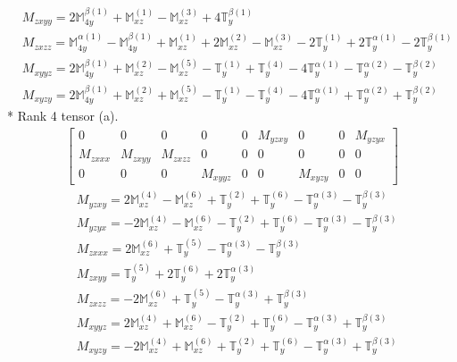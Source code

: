 \documentclass[fleqn,8pt,landscape]{jsarticle}
\begin{document}
\begin{align*}
& M_{zxyy} = 2 \mathbb{M}_{4y}^{\beta(1)} + \mathbb{M}_{xz}^{(1)} - \mathbb{M}_{xz}^{(3)} + 4 \mathbb{T}_{y}^{\beta(1)} \\
& M_{zxzz} = \mathbb{M}_{4y}^{\alpha(1)} - \mathbb{M}_{4y}^{\beta(1)} + \mathbb{M}_{xz}^{(1)} + 2 \mathbb{M}_{xz}^{(2)} - \mathbb{M}_{xz}^{(3)} - 2 \mathbb{T}_{y}^{(1)} + 2 \mathbb{T}_{y}^{\alpha(1)} - 2 \mathbb{T}_{y}^{\beta(1)} \\
& M_{xyyz} = 2 \mathbb{M}_{4y}^{\beta(1)} + \mathbb{M}_{xz}^{(2)} - \mathbb{M}_{xz}^{(5)} - \mathbb{T}_{y}^{(1)} + \mathbb{T}_{y}^{(4)} - 4 \mathbb{T}_{y}^{\alpha(1)} - \mathbb{T}_{y}^{\alpha(2)} - \mathbb{T}_{y}^{\beta(2)} \\
& M_{xyzy} = 2 \mathbb{M}_{4y}^{\beta(1)} + \mathbb{M}_{xz}^{(2)} + \mathbb{M}_{xz}^{(5)} - \mathbb{T}_{y}^{(1)} - \mathbb{T}_{y}^{(4)} - 4 \mathbb{T}_{y}^{\alpha(1)} + \mathbb{T}_{y}^{\alpha(2)} + \mathbb{T}_{y}^{\beta(2)}
\end{align*}
* Rank 4 tensor (a).
\begin{align*}
\begin{bmatrix} 0 & 0 & 0 & 0 & 0 & M_{yzxy} & 0 & 0 & M_{yzyx} \\ M_{zxxx} & M_{zxyy} & M_{zxzz} & 0 & 0 & 0 & 0 & 0 & 0 \\ 0 & 0 & 0 & M_{xyyz} & 0 & 0 & M_{xyzy} & 0 & 0 \end{bmatrix}
\end{align*}
\begin{align*}
& M_{yzxy} = 2 \mathbb{M}_{xz}^{(4)} - \mathbb{M}_{xz}^{(6)} + \mathbb{T}_{y}^{(2)} + \mathbb{T}_{y}^{(6)} - \mathbb{T}_{y}^{\alpha(3)} - \mathbb{T}_{y}^{\beta(3)} \\
& M_{yzyx} = - 2 \mathbb{M}_{xz}^{(4)} - \mathbb{M}_{xz}^{(6)} - \mathbb{T}_{y}^{(2)} + \mathbb{T}_{y}^{(6)} - \mathbb{T}_{y}^{\alpha(3)} - \mathbb{T}_{y}^{\beta(3)} \\
& M_{zxxx} = 2 \mathbb{M}_{xz}^{(6)} + \mathbb{T}_{y}^{(5)} - \mathbb{T}_{y}^{\alpha(3)} - \mathbb{T}_{y}^{\beta(3)} \\
& M_{zxyy} = \mathbb{T}_{y}^{(5)} + 2 \mathbb{T}_{y}^{(6)} + 2 \mathbb{T}_{y}^{\alpha(3)} \\
& M_{zxzz} = - 2 \mathbb{M}_{xz}^{(6)} + \mathbb{T}_{y}^{(5)} - \mathbb{T}_{y}^{\alpha(3)} + \mathbb{T}_{y}^{\beta(3)} \\
& M_{xyyz} = 2 \mathbb{M}_{xz}^{(4)} + \mathbb{M}_{xz}^{(6)} - \mathbb{T}_{y}^{(2)} + \mathbb{T}_{y}^{(6)} - \mathbb{T}_{y}^{\alpha(3)} + \mathbb{T}_{y}^{\beta(3)} \\
& M_{xyzy} = - 2 \mathbb{M}_{xz}^{(4)} + \mathbb{M}_{xz}^{(6)} + \mathbb{T}_{y}^{(2)} + \mathbb{T}_{y}^{(6)} - \mathbb{T}_{y}^{\alpha(3)} + \mathbb{T}_{y}^{\beta(3)}
\end{align*}
\end{document}
